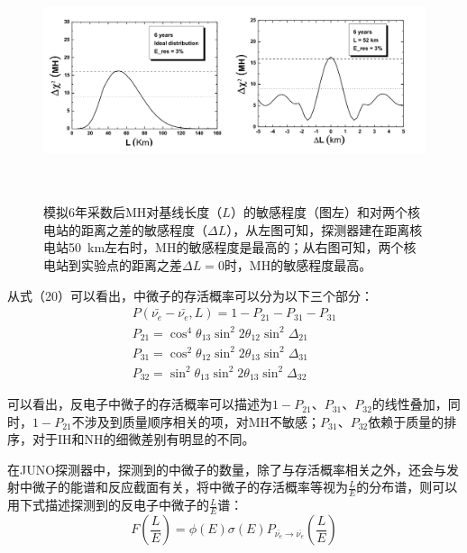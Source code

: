 \documentclass[10pt,a4paper]{article}
\begin{document}
\begin{figure}[H]
 \centering
 \includegraphics[height=7cm]{images/L-selet1.png}
 \caption{模拟6年采数后MH对基线长度（$L$）的敏感程度（图左）和对两个核电站的距离之差的敏感程度（$\Delta L$），从左图可知，探测器建在距离核电站\SI{50}{km}左右时，MH的敏感程度是最高的；从右图可知，两个核电站到实验点的距离之差$\Delta L=0$时，MH的敏感程度最高。}
 \label{fig:21}
\end{figure}



从式（20）可以看出，中微子的存活概率可以分为以下三个部分\cite{Zhan:2008id}：
 \begin{equation}
 \label{con:eq25}
 \begin{split}
P(\bar{\nu_e}-\bar{\nu_e},L)=1-P_{21}-P_{31}-P_{31}\\
P_{21}=\cos^4{\theta_{13}}\sin^2{2\theta_{12}}\sin^2{\Delta_{21}}\\
P_{31}=\cos^2{\theta_{12}}\sin^2{2\theta_{13}}\sin^2{\Delta_{31}}\\
P_{32}=\sin^2\theta_{13}\sin^2{2\theta_{13}}\sin^2{\Delta_{32}} 
 \end{split}
 \end{equation}

可以看出，反电子中微子的存活概率可以描述为$1-P_{21}$、$P_{31}$、$P_{32}$的线性叠加，同时，$1-P_{21}$不涉及到质量顺序相关的项，对MH不敏感；$P_{31}$、$P_{32}$依赖于质量的排序，对于IH和NH的细微差别有明显的不同。

在JUNO探测器中，探测到的中微子的数量，除了与存活概率相关之外，还会与发射中微子的能谱和反应截面有关，将中微子的存活概率等视为$\frac{L}{E}$的分布谱，则可以用下式描述探测到的反电子中微子的$\frac{L}{E}$谱：
\begin{equation}
\label{con:eq26}
F(\frac{L}{E})=\phi(E)\sigma(E)P_{\bar{\nu_e}\rightarrow\bar{\nu_e}}(\frac{L}{E})
\end{equation}
\end{document}
